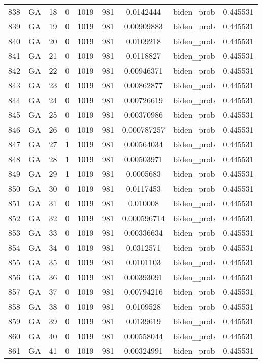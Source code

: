 \documentclass[12pt,a4paper]{article}
\begin{document}
\begin{tabular}{r|cccccccc}
	838 & GA & 18 & 0 & 1019 & 981 & 0.0142444 & biden\_prob & 0.445531 \\
	839 & GA & 19 & 0 & 1019 & 981 & 0.00909883 & biden\_prob & 0.445531 \\
	840 & GA & 20 & 0 & 1019 & 981 & 0.0109218 & biden\_prob & 0.445531 \\
	841 & GA & 21 & 0 & 1019 & 981 & 0.0118827 & biden\_prob & 0.445531 \\
	842 & GA & 22 & 0 & 1019 & 981 & 0.00946371 & biden\_prob & 0.445531 \\
	843 & GA & 23 & 0 & 1019 & 981 & 0.00862877 & biden\_prob & 0.445531 \\
	844 & GA & 24 & 0 & 1019 & 981 & 0.00726619 & biden\_prob & 0.445531 \\
	845 & GA & 25 & 0 & 1019 & 981 & 0.00370986 & biden\_prob & 0.445531 \\
	846 & GA & 26 & 0 & 1019 & 981 & 0.000787257 & biden\_prob & 0.445531 \\
	847 & GA & 27 & 1 & 1019 & 981 & 0.00564034 & biden\_prob & 0.445531 \\
	848 & GA & 28 & 1 & 1019 & 981 & 0.00503971 & biden\_prob & 0.445531 \\
	849 & GA & 29 & 1 & 1019 & 981 & 0.0005683 & biden\_prob & 0.445531 \\
	850 & GA & 30 & 0 & 1019 & 981 & 0.0117453 & biden\_prob & 0.445531 \\
	851 & GA & 31 & 0 & 1019 & 981 & 0.010008 & biden\_prob & 0.445531 \\
	852 & GA & 32 & 0 & 1019 & 981 & 0.000596714 & biden\_prob & 0.445531 \\
	853 & GA & 33 & 0 & 1019 & 981 & 0.00336634 & biden\_prob & 0.445531 \\
	854 & GA & 34 & 0 & 1019 & 981 & 0.0312571 & biden\_prob & 0.445531 \\
	855 & GA & 35 & 0 & 1019 & 981 & 0.0101103 & biden\_prob & 0.445531 \\
	856 & GA & 36 & 0 & 1019 & 981 & 0.00393091 & biden\_prob & 0.445531 \\
	857 & GA & 37 & 0 & 1019 & 981 & 0.00794216 & biden\_prob & 0.445531 \\
	858 & GA & 38 & 0 & 1019 & 981 & 0.0109528 & biden\_prob & 0.445531 \\
	859 & GA & 39 & 0 & 1019 & 981 & 0.0139619 & biden\_prob & 0.445531 \\
	860 & GA & 40 & 0 & 1019 & 981 & 0.00558044 & biden\_prob & 0.445531 \\
	861 & GA & 41 & 0 & 1019 & 981 & 0.00324991 & biden\_prob & 0.445531 \\

\end{tabular}
\end{document}
